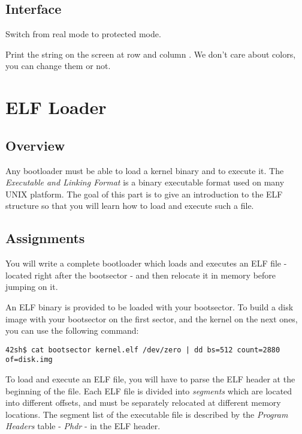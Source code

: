 \subsection*{Interface}
{
  Switch from real mode to protected mode.
}

{
  Print the string  on the screen at row 
  and column . We don't care about colors, you can change them
  or not.
}

%
%

\newpage

\section{ELF Loader}

\subsection*{Overview}
Any bootloader must be able to load a kernel binary and to execute it.
The \emph{Executable and Linking Format} is a binary executable format used on
many UNIX platform. The goal of this part is to give an introduction to the
ELF structure so that you will learn how to load and execute such a file.

\subsection*{Assignments}
You will write a complete bootloader which loads and executes an ELF file
- located right after the bootsector - and then relocate it in memory
before jumping on it.

An ELF binary is provided to be loaded with your bootsector. To build
a disk image with your bootsector on the first sector, and the kernel on the
next ones, you can use the following command:

\begin{verbatim}
42sh$ cat bootsector kernel.elf /dev/zero | dd bs=512 count=2880 of=disk.img
\end{verbatim}

To load and execute an ELF file, you will have to parse the ELF header at the
beginning of the file. Each ELF file is divided into \emph{segments} which are
located into different offsets, and must be separately relocated at different
memory locations. The segment list of the executable file is described by the
\emph{Program Headers} table - \emph{Phdr} - in the ELF header.

